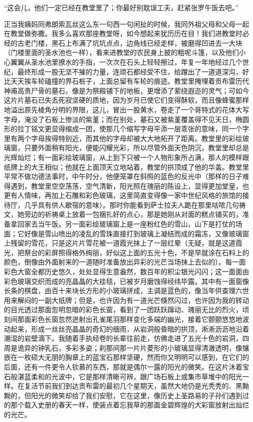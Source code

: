 \par “这会儿，他们一定已经在教堂里了；你最好别耽误工夫，赶紧张罗午饭去吧。”
\par 正当我姨妈同弗朗索瓦丝这么东一句西一句闲扯的时候，我同外祖父母和父母一起在教堂做弥撒。我多么喜欢那座教堂呀，如今想起来犹历历在目！我们进教堂时必经的古老门楼，黑石上布满了坑坑点点，边角线已经走样，被磨得凹进去一大块（门楼里面的圣水池也一样），看来进教堂的农民身上披的粗呢斗篷，以及他们小心翼翼从圣水池里撩水的手指，一次次在石头上轻轻擦过，年复一年地经过几个世纪，最终形成一股无坚不摧的力量，连顽石都经受不住，给蹭出了一道道深沟，好比天天挨车轮磕撞的界石桩子，上面总留有车轮的痕迹。教堂里掩埋着贡布雷历代神甫高贵尸骨的墓石，像是为祭殿铺下的地板，更增添了萦绕遐迩的灵气；可如今这片片墓石已失去死寂坚硬的质地，因为岁月已使它们变得酥软，而且像蜂蜜那样地溢出原先棱角分明的界限，这儿，冒出一股黄水，卷走了一个哥特式的花体大写字母，淹没了石板上惨淡的紫堇；而在别处，墓石又被紫堇覆盖得不见天日，椭圆形的拉丁铭文更显得缩成一团，使那几个缩写字母平添一层乖张的意味，同一个字里有两个字母挨得特别近，而其他的字母却被大大地拓开了距离。教堂里的彩绘玻璃窗，只要外面稍有阳光，便能闪耀光彩，所以尽管外面天色阴沉，教堂里却总是光辉灿烂；有一面彩绘玻璃窗，从上到下只被一个人物形象所占满，那人的模样跟纸牌上的大王相似；他就在上面顶天立地站着，教堂的拱顶成了他的华盖。教堂里平常不做功德法事时，中午时分，他便笼罩在斜照的蓝色的反光中（那样的日子难得遇到，教堂里空空荡荡，空气清新，阳光照在瑰丽的陈设上，显得更加堂皇，也更有人情味，再加上石雕和彩色玻璃，这里简直变得像一家中世纪风格的旅馆的接待厅，几乎具有供人歇宿的意味）。那时你能看到萨士拉夫人跪在那里咕哝几句祷文，她旁边的祈祷桌上放着一包捆扎好的点心，那是她刚从对面的糕点铺买的，准备拿回家去当午饭。另一面彩绘玻璃窗上是一座粉红色的雪山，山下是打仗的场面；它好像是雪山喷出的凌乱的雪珠直接打到玻璃上凝结而成的霜冻，又像玻璃窗上残留的雪花，只是这片片雪花被一道霞光抹上了一层红晕（无疑，就是这道霞光，把祭台的彩屏照得格外绚丽，好似这上面的五光十色，不是早就涂在石料上的颜色，倒像由外面射来的一道随时准备放出异彩的光芒当场抹上去似的）。每一面彩色大窗全都历史悠久，处处显得生意盎然，数百年的积尘银光闪闪；这一面面由彩色玻璃交织而成的亮晶晶的大挂毯，已被岁月磨蚀得经纬毕露。其中有一面窗像长条的棋盘，由百十来块长方形的小玻璃拼成，主调是蓝色的，像当年供查理六世用来解闷的一副大纸牌；但是，也许因为有一道光芒倏然闪过，也许因为我的转动的目光透过那面忽明忽暗的彩色长窗，看到了一团跃跃蹿动、瑰丽无比的烈火，顷刻间那面彩色长窗忽然迸射出孔雀尾羽那样变化多端的幽光，接着它颤颤悠悠地波动起来，形成一丝丝亮晶晶的奇幻的细雨，从岩洞般昏暗的拱顶，淅淅沥沥地沿着潮湿的岩壁滴下。我随着手执经卷的长辈往前走，仿佛走进了五光十色的岩洞，四周是诡异的钟乳石，多彩多姿；刹那间那一片片菱形的小玻璃显得清澈透明，像镶嵌在一枚硕大无朋的胸章上的蓝宝石那样坚硬，然而你又明明可以感到，在它们的后面，还有一件更令人钦慕的东西，那就是偶尔一露的阳光的微笑。在这片沐着宝石般湛蓝柔和的光波中，它是那样清晰可辨，跟广场石板上或集市草堆中的阳光一样。在复活节前我们到达贡布雷的最初几个星期天，虽然大地仍是光秃秃的、黑黝黝的，但阳光的微笑却给了我们安慰，它在这里，像历史上圣路易的子孙们遇到过的那个载入史册的春天一样，使装点着忘我草的那面金碧辉煌的大彩窗放射出灿烂的光芒。
